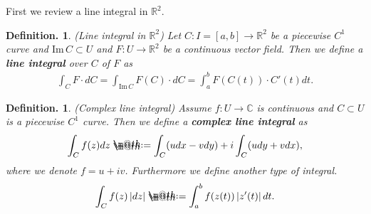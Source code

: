 \documentclass[openany, a4paper, oneside]{jsbook}
\makeatletter
\newcommand*{\defeq}{\mathrel{\rlap{%
\raisebox{0.3ex}{$\m@th\cdot$}}%
\raisebox{-0.3ex}{$\m@th\cdot$}}%
=}
\theoremstyle{break}
\theoremstyle{breakdefn}
\newtheorem{defn}[thm]{Definition.}
\newcommand{\abs}[1]{\left|#1\right|}
\newcommand{\bbC}{\mathbb{C}}
\newcommand{\bbR}{\mathbb{R}}
\newcommand{\Image}{\mathrm{Im}\,}
\newcommand{\upbf}[1]{\textup{\textbf{#1}}}
\makeatother
\begin{document}
First we review a line integral in $\bbR^2$.
\begin{defn}\textup{(Line integral in $\bbR^2$)}
 Let $C \colon I=[a,b] \to \bbR^2$ be a piecewise $C^1$ curve and $\Image C \subset U$ and
 $F \colon U \to \bbR^2$ be a continuous vector field.
 Then we define a \upbf{line integral} over $C$ of $F$ as
 \begin{align}
  \int_{C} F \cdot dC
  =
  \int_{\Image C} F (C) \cdot dC
  =
  \int_a^b F (C (t)) \cdot C'(t) dt.
 \end{align}
\end{defn}
\begin{defn}\textup{(Complex line integral)}
 Assume $f \colon U \to \bbC$ is continuous and $C \subset U$ is a piecewise $C^1$ curve.
 Then we define a \upbf{complex line integral} as
 \begin{align}
  \int_C f (z) dz
  \defeq
  \int_C (u dx - v dy) + i \int_C (u dy + v dx),
 \end{align}
 where we denote $f = u + iv$.
 Furthermore we define another type of integral.
 \begin{align}
  \int_C f (z) \abs{dz}
  \defeq
  \int_a^b f (z (t)) \abs{z'(t)} dt.
 \end{align}
\end{defn}
\end{document}
